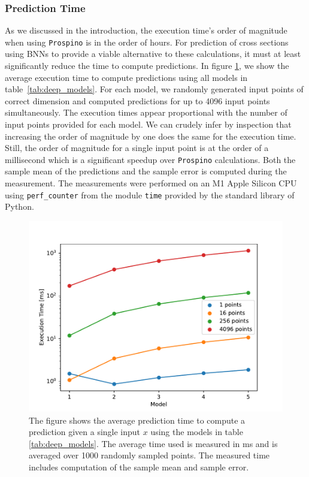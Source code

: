 \subsubsection{Prediction Time}
As we discussed in the introduction, the execution time's order of magnitude when using {\tt Prospino} is in the order of hours. 
For prediction of cross sections using BNNs to provide a viable alternative to these calculations, it must at least significantly reduce the time to compute predictions. In figure \ref{fig:prediction_time}, we 
show the average execution time to compute predictions using all models in table~\ref{tab:deep_models}.
For each model, we randomly generated input points of correct dimension and computed predictions for up to 4096 input points simultaneously.
The execution times appear proportional with the number of input points provided for each model. We can crudely infer by inspection that increasing the order of magnitude by one does the same for the execution time. Still, the order of magnitude for a single input point is at the order of a millisecond which is a significant speedup over {\tt Prospino} calculations. Both the sample mean of the predictions and the sample error is computed during the measurement. The measurements were performed on an M1 Apple Silicon CPU using {\tt perf\_counter} from the module {\tt time} provided by the standard library of Python.

\begin{figure}
    \centering
    \includegraphics[scale=1]{figures/prediction_time/prediction_time.pdf}
    \caption{The figure shows the average prediction time to compute a prediction given a single input $x$ using the models in table \ref{tab:deep_models}. The average time used is measured in ms and is averaged over 1000 randomly sampled points. The measured time includes computation of the sample mean and sample error.
    }
    \label{fig:prediction_time}
\end{figure}

